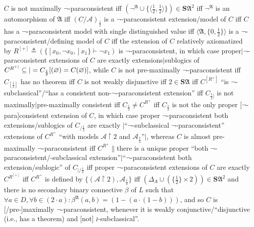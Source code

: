 \documentclass[bsl,meeting]{asl}
\newcommand{\mf}[1]{\mathfrak{#1}}
\newcommand{\mc}[1]{\mathcal{#1}}
\newcommand{\mbf}[1]{\mathbf{#1}}
\newcommand{\couple}[2]{\langle{#1},{#2}\rangle}
\newcommand{\restr}{{\upharpoonright}}
\def\e{{\frac{1}{2}} }
\begin{document}
\begin{theorem}
$C$ is not maximally\/ $\neg$-paraconsistent iff\/
$(\neg^\mf{A}\cup\{\couple{\e}{\e}\})\in\mbf{S}\mf{A}^2$ iff\/
$\neg^\mf{A}$ is an automorphism of\/ $\mf{A}$ iff\/
$(C/\mc{A})_\e$ is a\/ $\neg$-paraconsistent extension/model of\/
$C$ iff\/ $C$ has a\/ $\neg$-paraconsistent model with single
distinguished value iff\/ $\couple{\mf{A}}{\{0,\e\}}$
is a\/ $\neg$-paraconsistent/defining model of\/ $C$ iff
the extension of\/ $C$ relatively axiomatized by
$R^{[+]}\triangleq(\{[x_0,\neg x_0,]x_1\}\vdash\neg x_1)$
is\/ $\neg$-paraconsistent, in which case
proper\/$|\neg$-paraconsistent extensions of\/ $C$
are exactly extensions\/$|$sublogics of\/
$C^{R^{+|}}\subseteq|=C_\e[(\varnothing)\linebreak=C(\varnothing)]$,
while\/ $C$ is not pre-maximally\/ $\neg$-paraconsistent iff\/
$C_{[\e]}$ has no theorem iff\/ $C$ is not weakly disjunctive iff\/
$2\in\mbf{S}\mf{A}$ iff\/
$C^{[R^+]}$ ``is\/ $\neg$-subclassical''/``has a consistent
non-$\neg$-paraconsistent extension'' iff\/
$C_{\e|}$ is not maximally\/$|$pre-maximally consistent iff\/
$C_\e\neq C^{R^+}$ iff\/ $C_\e$ is not the only proper
[\/$\neg$-para]consistent extension of\/ $C$,
in which case proper\/ $\neg$-paraconsistent both
extensions/sublogics of\/ $C_{/\e}$ are exactly\/
$|$``\/$\neg$-subclassical\/ $\neg$-paraconsistent''
extensions of\/ $C^{R^+}$ ``with models $\mc{A}\restr2$ and
$\mc{A}_\e$''\/$|$, whereas\/ $C$ is almost pre-maximally\/
$\neg$-paraconsistent iff\/
$C^{R^+}\|$there is a unique proper ``both\/
$\neg$-paraconsistent/-subclassical
extension''\/$|$``\/$\neg$-paraconsistent both
extension/sublogic'' of\/ $C_{|/\e}$ iff proper\/
$\neg$-paraconsistent extensions of\/ $C$ are exactly\/
$C^{R^{[+]}}$ iff\/ $C^{R^+}$ is defined
by\/ $\{%
(\mc{A}\restr2),\mc{A}_\e\}$
iff\/ $(\Delta_A\cup(\{\e\}\times2))\in\mbf{S}\mf{A}^2$
and there is no secondary binary connective $\beta$ of $L$ %
such that\/ $\forall a\in D,\forall b\in(2\cdot a):
\beta^\mf{A}(a,b)=(1-(a\cdot(1-b)))$,
and so\/ $C$ is [/pre-]maximally\/ $\neg$-paraconsistent,
whenever it is weakly con\-jun\-c\-ti\-ve/``dis\-jun\-c\-ti\-ve (i.e., has a
theorem) and [not]\/ $\wr$-subclassical''.
\end{theorem}


\vspace*{-0.5\baselineskip}
\end{document}
